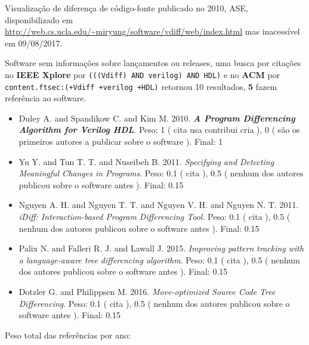 Visualização de diferença de código-fonte
publicado no 2010, ASE,
disponibilizado em \url{http://web.cs.ucla.edu/~miryung/software/vdiff/web/index.html}
mas inacessível em 09/08/2017.

Software sem informações sobre lançamentos ou releases,
uma busca por citações no {\bf IEEE Xplore} por
\texttt{(((Vdiff) AND verilog) AND HDL)}
e no {\bf ACM} por
\texttt{content.ftsec:(+Vdiff +verilog +HDL)}
retornou
10 resultados,
{\bf 5} fazem referência ao software.

\begin{itemize}
\item Duley A. and Spandikow C. and Kim M.
      2010.
        \textbf{\textit{ A Program Differencing Algorithm for Verilog HDL}}.
      Peso:
      1 (
          cita
          usa
          contribui
          cria
      ),
      0 (
são os primeiros autores a publicar sobre o software
      ).
      Final:
      1

\item Yu Y. and Tun T. T. and Nuseibeh B.
      2011.
        \textit{ Specifying and Detecting Meaningful Changes in Programs}.
      Peso:
      0.1 (
          cita
      ),
      0.5 (
nenhum dos autores publicou sobre o software antes
      ).
      Final:
      0.15

\item Nguyen A. H. and Nguyen T. T. and Nguyen V. H. and Nguyen N. T.
      2011.
        \textit{ iDiff: Interaction-based Program Differencing Tool}.
      Peso:
      0.1 (
          cita
      ),
      0.5 (
nenhum dos autores publicou sobre o software antes
      ).
      Final:
      0.15

\item Palix N. and Falleri R. J. and Lawall J.
      2015.
        \textit{ Improving pattern tracking with a language-aware tree differencing algorithm}.
      Peso:
      0.1 (
          cita
      ),
      0.5 (
nenhum dos autores publicou sobre o software antes
      ).
      Final:
      0.15

\item Dotzler G. and Philippsen M.
      2016.
        \textit{ Move-optimized Source Code Tree Differencing}.
      Peso:
      0.1 (
          cita
      ),
      0.5 (
nenhum dos autores publicou sobre o software antes
      ).
      Final:
      0.15

\end{itemize}

Peso total das referências por ano:

